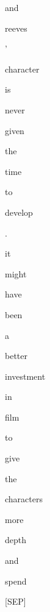 \documentclass[varwidth=150mm]{standalone}
\begin{document}
\begin{CJK*}{UTF8}{gbsn}
{{{\colorbox{red!9.980586051940918}{\strut and} \colorbox{red!8.431440353393555}{\strut reeves} \colorbox{red!1.097668170928955}{\strut '} \colorbox{red!6.909692287445068}{\strut character} \colorbox{red!1.3437095880508423}{\strut is} \colorbox{red!0.0}{\strut never} \colorbox{red!0.0}{\strut given} \colorbox{red!0.0}{\strut the} \colorbox{red!0.0}{\strut time} \colorbox{red!0.0}{\strut to} \colorbox{red!2.6151883602142334}{\strut develop} \colorbox{red!0.0}{\strut .} \colorbox{red!1.4481263160705566}{\strut it} \colorbox{red!0.0}{\strut might} \colorbox{red!0.0}{\strut have} \colorbox{red!0.0}{\strut been} \colorbox{red!0.0}{\strut a} \colorbox{red!0.0}{\strut better} \colorbox{red!1.6458714008331299}{\strut investment} \colorbox{red!0.0}{\strut in} \colorbox{red!12.367300033569336}{\strut film} \colorbox{red!2.751777172088623}{\strut to} \colorbox{red!0.0}{\strut give} \colorbox{red!3.4580237865448}{\strut the} \colorbox{red!25.89326286315918}{\strut characters} \colorbox{red!0.0}{\strut more} \colorbox{red!1.194000005722046}{\strut depth} \colorbox{red!5.432345867156982}{\strut and} \colorbox{red!0.0}{\strut spend} \colorbox{red!0.0}{\strut [SEP]}
}}}
\end{CJK*}
\end{document}
